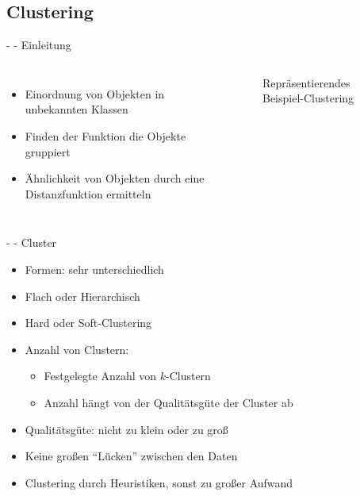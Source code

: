 \documentclass[fleqn,11pt,aspectratio=43]{beamer}
\begin{document}
\subsection{Clustering~}

\begin{frame}{\insertsectionhead - \insertsubsectionhead - Einleitung \cite{ester2000knowledge}}
\begin{columns}[onlytextwidth]
\begin{itemize}
\setlength{\itemsep}{30pt}
\item Einordnung von Objekten in unbekannten Klassen
\item Finden der Funktion die Objekte gruppiert
\item Ähnlichkeit von Objekten durch eine Distanzfunktion ermitteln
\end{itemize}
\begin{figure}
\scalebox{0.75}{}
\caption{Repräsentierendes Beispiel-Clustering}
\end{figure}
\end{columns}
\end{frame}

\begin{frame}{\insertsectionhead - \insertsubsectionhead - Cluster \cite{dwh}}
\begin{itemize}
\setlength{\itemsep}{10pt}
\item Formen: sehr unterschiedlich
\item Flach oder Hierarchisch
\item Hard oder Soft-Clustering
\item Anzahl von Clustern:
\begin{itemize}
\item Festgelegte Anzahl von $k$-Clustern
\item Anzahl hängt von der Qualitätsgüte der Cluster ab
\end{itemize} 
\item Qualitätsgüte: nicht zu klein oder zu groß
\item Keine großen \enquote{Lücken} zwischen den Daten
\item Clustering durch Heuristiken, sonst zu großer Aufwand
\end{itemize}
\end{frame}
\end{document}
